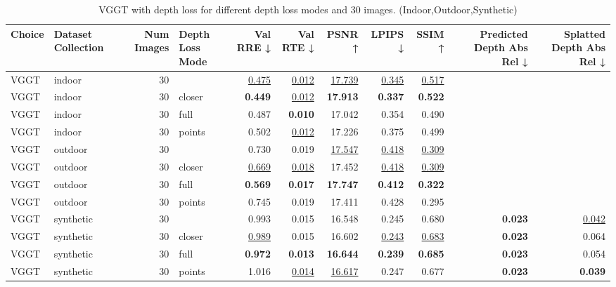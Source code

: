 \begin{table}[H]
\caption{VGGT with depth loss for different depth loss modes and $30$ images. (Indoor,Outdoor,Synthetic)}
\label{tab:05_depth_loss_sparse_indoor,outdoor,synthetic}
\centering
\scriptsize
\begin{tabular}{llrlrrrrrrr}
\toprule
Choice & Dataset Collection & Num Images & Depth Loss Mode & Val RRE ↓ & Val RTE ↓ & PSNR ↑ & LPIPS ↓ & SSIM ↑ & Predicted Depth Abs Rel ↓ & Splatted Depth Abs Rel ↓ \\
\midrule
VGGT & indoor & 30 &  & \underline{0.475} & \underline{0.012} & \underline{17.739} & \underline{0.345} & \underline{0.517} &  &  \\
VGGT & indoor & 30 & closer & \textbf{0.449} & \underline{0.012} & \textbf{17.913} & \textbf{0.337} & \textbf{0.522} &  &  \\
VGGT & indoor & 30 & full & 0.487 & \textbf{0.010} & 17.042 & 0.354 & 0.490 &  &  \\
VGGT & indoor & 30 & points & 0.502 & \underline{0.012} & 17.226 & 0.375 & 0.499 &  &  \\
\midrule
VGGT & outdoor & 30 &  & 0.730 & 0.019 & \underline{17.547} & \underline{0.418} & \underline{0.309} &  &  \\
VGGT & outdoor & 30 & closer & \underline{0.669} & \underline{0.018} & 17.452 & \underline{0.418} & \underline{0.309} &  &  \\
VGGT & outdoor & 30 & full & \textbf{0.569} & \textbf{0.017} & \textbf{17.747} & \textbf{0.412} & \textbf{0.322} &  &  \\
VGGT & outdoor & 30 & points & 0.745 & 0.019 & 17.411 & 0.428 & 0.295 &  &  \\
\midrule
VGGT & synthetic & 30 &  & 0.993 & 0.015 & 16.548 & 0.245 & 0.680 & \textbf{0.023} & \underline{0.042} \\
VGGT & synthetic & 30 & closer & \underline{0.989} & 0.015 & 16.602 & \underline{0.243} & \underline{0.683} & \textbf{0.023} & 0.064 \\
VGGT & synthetic & 30 & full & \textbf{0.972} & \textbf{0.013} & \textbf{16.644} & \textbf{0.239} & \textbf{0.685} & \textbf{0.023} & 0.054 \\
VGGT & synthetic & 30 & points & 1.016 & \underline{0.014} & \underline{16.617} & 0.247 & 0.677 & \textbf{0.023} & \textbf{0.039} \\
\bottomrule
\end{tabular}
\end{table}